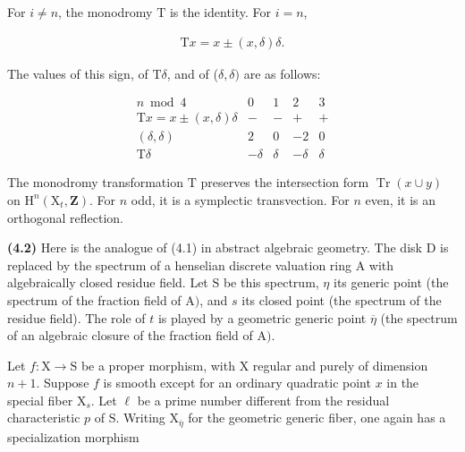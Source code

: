 \documentclass[10pt,leqno]{article}
\begin{document}
\noindent For \(i\ne n\), the monodromy \(\mathrm{T}\) is the identity. For \(i=n\),\par

\begin{equation*}\begin{gathered}\mathrm{T}x = x \pm  (x,\delta )\delta .\end{gathered}\end{equation*}

\noindent The values of this sign, of \(\mathrm{T}\delta \), and of (\(\delta ,\delta )\) are as follows:\par

\[\begin{array}{crrrr}n\bmod4&0&1&2&3\\ \mathrm Tx=x\pm(x,\delta)\delta&-&-&+&+\\ (\delta,\delta)&2&0&-2&0\\ \mathrm T\delta&-\delta&\delta&-\delta&\delta\end{array}\]

\clearpage

\label{physical-17}\par\smallskip

\noindent The monodromy transformation \(\mathrm{T}\) preserves the intersection form \(\operatorname{Tr}(x\cup y)\) on \(\mathrm{H}^{n}(\mathrm{X}_{t},\mathbf{Z})\). For \(n\) odd, it is a symplectic transvection. For \(n\) even, it is an orthogonal reflection.\par

\noindent \textbf{(4.2)} Here is the analogue of (4.1) in abstract algebraic geometry. The disk \(\mathrm{D}\) is replaced by the spectrum of a henselian discrete valuation ring \(\mathrm{A}\) with algebraically closed residue field. Let \(\mathrm{S}\) be this spectrum, \(\eta \) its generic point (the spectrum of the fraction field of \(\mathrm{A})\), and \(s\) its closed point (the spectrum of the residue field). The role of \(t\) is played by a geometric generic point \(\overline{\eta }\) (the spectrum of an algebraic closure of the fraction field of \(\mathrm{A})\).\par

\noindent Let \(f : \mathrm{X}\longrightarrow \mathrm{S}\) be a proper morphism, with \(\mathrm{X}\) regular and purely of dimension \(n+1\). Suppose \(f\) is smooth except for an ordinary quadratic point \(x\) in the special fiber \(\mathrm{X}_{s}\). Let \(\ell \) be a prime number different from the residual characteristic \(p\) of \(\mathrm{S}\). Writing \(\mathrm{X}_{\overline{\eta }}\) for the geometric generic fiber, one again has a specialization morphism\par
\end{document}
